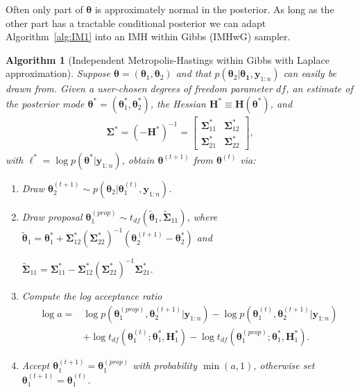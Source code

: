 \documentclass[12pt]{article}
\newtheorem{alg}{Algorithm}
\begin{document}
Often only part of $\bm{\theta}$ is approximately normal in the posterior. As long as the other part has a tractable conditional posterior we can adapt Algorithm~\ref{alg:IM1} into an IMH within Gibbs (IMHwG) sampler. 
\begin{alg}[Independent Metropolis-Hastings within Gibbs with Laplace approximation]\label{alg:IM2}
Suppose $\bm{\theta} = (\bm{\theta}_1, \bm{\theta}_2)$ and that $p(\bm{\theta}_2|\bm{\theta_1}, \bm{y}_{1:n})$ can easily be drawn from. Given a user-chosen degrees of freedom parameter $df$, an estimate of the posterior mode $\bm{\theta}^* = (\bm{\theta}_1^*, \bm{\theta}_2^*)$, the Hessian $\bm{H}^* \equiv \bm{H}(\bm{\theta}^*)$, and 
\begin{align*}
\bm{\Sigma}^* = (-\bm{H}^*)^{-1} = \begin{bmatrix} \bm{\Sigma}^*_{11} & \bm{\Sigma}^*_{12} \\ \bm{\Sigma}^*_{21} & \bm{\Sigma}^*_{22} \end{bmatrix},
\end{align*}
with $\ell^* = \log p(\bm{\theta}^*|\bm{y}_{1:n})$, obtain $\bm{\theta}^{(t+1)}$ from $\bm{\theta}^{(t)}$ via:
\begin{enumerate}
\item Draw $\bm{\theta}_2^{(t+1)} \sim p(\bm{\theta}_2|\bm{\theta}_1^{(t)},\bm{y}_{1:n})$.
\item Draw proposal $\bm{\theta}_1^{(prop)} \sim t_{df}(\widetilde{\bm{\theta}}_1, \widetilde{\bm{\Sigma}}_{11})$, where $\widetilde{\bm{\theta}}_1 = \bm{\theta}_1^* + \bm{\Sigma}_{12}^*(\bm{\Sigma}_{22}^*)^{-1}(\bm{\theta}_2^{(t+1)} - \bm{\theta}_2^*)$ and 

$\widetilde{\bm{\Sigma}}_{11} = \bm{\Sigma}_{11}^* - \bm{\Sigma}_{12}^*(\bm{\Sigma}_{22}^*)^{-1}\bm{\Sigma}_{21}^*$.
\item Compute the log acceptance ratio 
\begin{align*}
\log a =& \log p(\bm{\theta}_1^{(prop)}, \bm{\theta}_2^{(t+1)}|\bm{y}_{1:n}) - \log p(\bm{\theta}_1^{(t)}, \bm{\theta}_2^{(t+1)}|\bm{y}_{1:n}) \\
&+ \log t_{df}(\bm{\theta}_1^{(t)}; \bm{\theta}_1^*, \bm{H}_1^*) - \log t_{df}(\bm{\theta}_1^{(prop)}; \bm{\theta}_1^*, \bm{H}_1^*).
\end{align*}
\item Accept $\bm{\theta}_1^{(t+1)} = \bm{\theta}_1^{(prop)}$ with probability $\min(a,1)$, otherwise set $\bm{\theta}_1^{(t+1)} = \bm{\theta}_1^{(t)}$.
\end{enumerate}
\end{alg}
\end{document}
